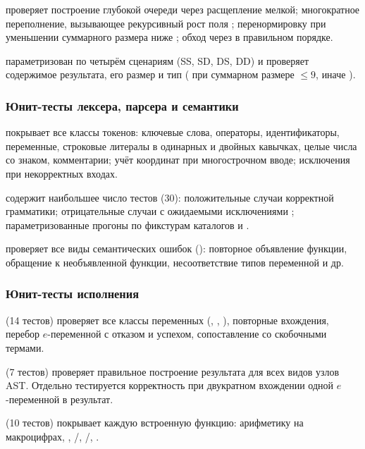  проверяет построение глубокой очереди через расщепление
мелкой; многократное переполнение, вызывающее рекурсивный рост поля
; перенормировку  при уменьшении суммарного размера
ниже ; обход через  в правильном порядке.

 параметризован по четырём сценариям 
(SS, SD, DS, DD) и проверяет содержимое результата, его размер и тип
( при суммарном размере $\le 9$, иначе ).

\subsubsection{Юнит-тесты лексера, парсера и семантики}

 покрывает все классы токенов: ключевые слова, операторы,
идентификаторы, переменные, строковые литералы в одинарных и двойных
кавычках, целые числа со знаком, комментарии; учёт координат при
многострочном вводе; исключения  при некорректных входах.

 содержит наибольшее число тестов (30): положительные
случаи корректной грамматики; отрицательные случаи с ожидаемыми
исключениями ; параметризованные прогоны по фикстурам
каталогов  и .

 проверяет все виды семантических ошибок
(): повторное объявление функции,
обращение к необъявленной функции, несоответствие типов переменной и др.

\subsubsection{Юнит-тесты исполнения}

 (14 тестов) проверяет все классы переменных (,
, ), повторные вхождения, перебор \(e\)-переменной с
отказом и успехом, сопоставление со скобочными термами.

 (7 тестов) проверяет правильное построение результата
для всех видов узлов AST. Отдельно тестируется корректность при
двукратном вхождении одной \(e\)-переменной в результат.

 (10 тестов) покрывает каждую встроенную функцию:
арифметику на макроцифрах, , /,
/, .

